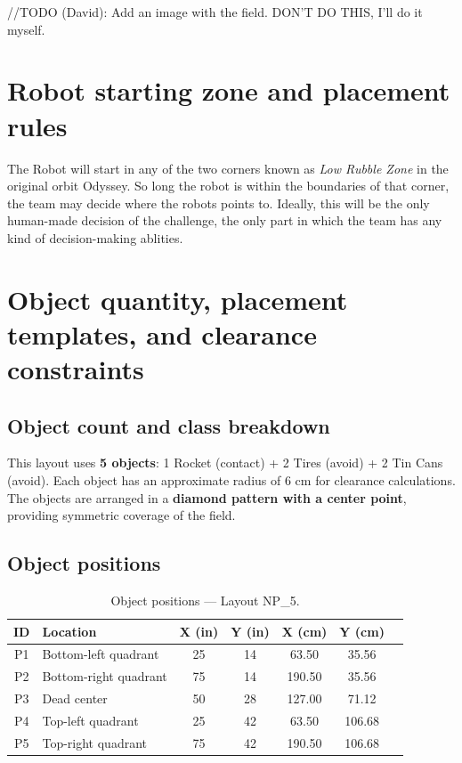 \documentclass[a4]{article}
\begin{document}
//TODO (David): Add an image with the field. DON'T DO THIS, I'll do it myself.

\section*{Robot starting zone and placement rules}
The Robot will start in any of the two corners known as \textit{Low Rubble Zone} in the original orbit Odyssey. So long the robot is within the boundaries of that corner, the team may decide where the robots points to. Ideally, this will be the only human-made decision of the challenge, the only part in which the team has any kind of decision-making ablities. 

\section*{Object quantity, placement templates, and clearance constraints}
\subsection*{Object count and class breakdown}
This layout uses \textbf{5 objects}: 1 Rocket (contact) + 2 Tires (avoid) + 2 Tin Cans (avoid). Each object has an approximate radius of 6 cm for clearance calculations. The objects are arranged in a \textbf{diamond pattern with a center point}, providing symmetric coverage of the field.

\subsection*{Object positions}

\begin{table}[H]
\centering
\begin{tabular}{clccccl}
\toprule
\textbf{ID} & \textbf{Location} & \textbf{X (in)} & \textbf{Y (in)} & \textbf{X (cm)} & \textbf{Y (cm)} \\
\midrule
P1 & Bottom-left quadrant & 25 & 14 & 63.50 & 35.56 \\
P2 & Bottom-right quadrant & 75 & 14 & 190.50 & 35.56 \\
P3 & Dead center & 50 & 28 & 127.00 & 71.12 \\
P4 & Top-left quadrant & 25 & 42 & 63.50 & 106.68 \\
P5 & Top-right quadrant & 75 & 42 & 190.50 & 106.68 \\
\bottomrule
\end{tabular}
\caption{Object positions --- Layout NP\_5.}
\end{table}
\end{document}
